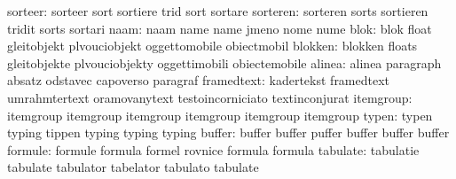                   sorteer: sorteer                   sort
                           sortiere                  trid
                           sort                      sortare %
                 sorteren: sorteren                  sorts
                           sortieren                 tridit
                           sorts                     sortari %
                     naam: naam                      name
                           name                      jmeno
                           nome                      nume
                     blok: blok                      float
                           gleitobjekt               plvouciobjekt
                           oggettomobile             obiectmobil
                  blokken: blokken                   floats
                           gleitobjekte              plvouciobjekty
                           oggettimobili             obiectemobile
                   alinea: alinea                    paragraph
                           absatz                    odstavec
                           capoverso                 paragraf
               framedtext: kadertekst                framedtext
                           umrahmtertext             oramovanytext
                           testoincorniciato         textinconjurat
                itemgroup: itemgroup                 itemgroup
                           itemgroup                 itemgroup
                           itemgroup                 itemgroup         
                    typen: typen                     typing
                           tippen                    typing
                           typing                    typing %
                   buffer: buffer                    buffer
                           puffer                    buffer
                           buffer                    buffer
                  formule: formule                   formula
                           formel                    rovnice
                           formula                   formula
                 tabulate: tabulatie                 tabulate
                           tabulator                 tabelator
                           tabulato                  tabulate

\stopsetupvariables




